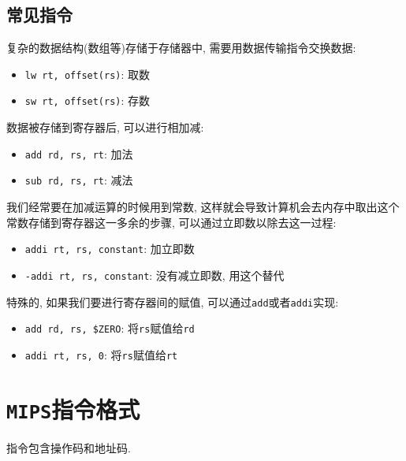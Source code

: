 \subsection{常见指令}
复杂的数据结构(数组等)存储于存储器中, 需要用数据传输指令交换数据:
\begin{itemize}
\item \verb|lw rt, offset(rs)|: 取数
\item \verb|sw rt, offset(rs)|: 存数
\end{itemize}\par
数据被存储到寄存器后, 可以进行相加减:
\begin{itemize}
\item \verb|add rd, rs, rt|: 加法
\item \verb|sub rd, rs, rt|: 减法
\end{itemize}\par
我们经常要在加减运算的时候用到常数, 这样就会导致计算机会去内存中取出这个常数存储到寄存器这一多余的步骤, 可以通过立即数以除去这一过程:
\begin{itemize}
\item \verb|addi rt, rs, constant|: 加立即数
\item \verb|-addi rt, rs, constant|: 没有减立即数, 用这个替代
\end{itemize}\par 
特殊的, 如果我们要进行寄存器间的赋值, 可以通过\verb|add|或者\verb|addi|实现:
\begin{itemize}
\item \verb|add rd, rs, $ZERO|: 将\verb|rs|赋值给\verb|rd|
\item \verb|addi rt, rs, 0|: 将\verb|rs|赋值给\verb|rt|
\end{itemize}
\section{\texttt{MIPS}指令格式}
指令包含操作码和地址码.
